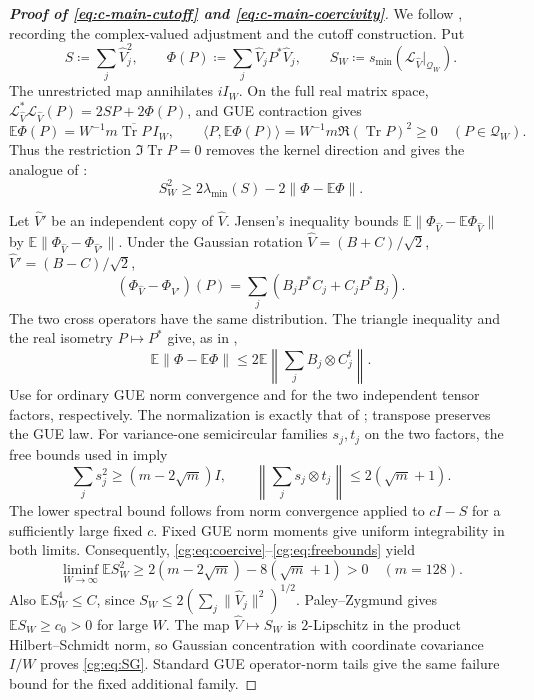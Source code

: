 \documentclass[11pt]{article}
\numberwithin{equation}{section}
\theoremstyle{remark}
\newcommand{\E}{\mathbb E}
\newcommand{\Tr}{\operatorname{Tr}}
\begin{document}
\begin{proof}[\textbf{Proof of \eqref{eq:c-main-cutoff} and \eqref{eq:c-main-coercivity}}]
We follow \cite[Appendix~A.1, proof of Lemma~A.2]{Drogin}, recording
the complex-valued adjustment and the cutoff construction.
Put
\[
 S\coloneqq\sum_j\widehat V_j^2,\qquad
 \Phi(P)\coloneqq\sum_j\widehat V_jP^*\widehat V_j,\qquad
 S_W\coloneqq s_{\min}(\mathcal L_{\widehat V}|_{\mathcal Q_W}).
\]
The unrestricted map annihilates \(iI_W\). On the full real matrix
space, \(\mathcal L_{\widehat V}^*\mathcal L_{\widehat V}(P)=2SP+2\Phi(P)\), and
GUE contraction gives
\[
 \E\Phi(P)=W^{-1} m\overline{\Tr P}\,I_W,\qquad
 \langle P,\E\Phi(P)\rangle
 =W^{-1} m\Re(\Tr P)^2\ge0\quad(P\in\mathcal Q_W).
\]
Thus the restriction \(\Im\Tr P=0\) removes the kernel direction
and gives the analogue of \cite[(42)]{Drogin}:
\begin{equation}
 S_W^2\ge2\lambda_{\min}(S)-2\|\Phi-\E\Phi\|.
 \label{cg:eq:coercive}
\end{equation}

Let \(\widehat V'\) be an independent copy of \(\widehat V\). Jensen's inequality
bounds \(\E\|\Phi_{\widehat V}-\E\Phi_{\widehat V}\|\) by \(\E\|\Phi_{\widehat V}-\Phi_{\widehat V'}\|\).
Under the Gaussian rotation
\(\widehat V=(B+C)/\sqrt2\), \(\widehat V'=(B-C)/\sqrt2\),
\[
 (\Phi_{\widehat V}-\Phi_{\widehat V'})(P)=\sum_j(B_jP^*C_j+C_jP^*B_j).
\]
The two cross operators have the same distribution. The triangle
inequality and the real isometry \(P\mapsto P^*\) give, as in
\cite[Appendix~A.1]{Drogin},
\begin{equation}
 \E\|\Phi-\E\Phi\|
 \le2\E\left\|\sum_jB_j\otimes C_j^t\right\|.
 \label{cg:eq:decouple}
\end{equation}
Use \cite[Corollary~1.2 and Lemma~9.6]{CGV} for ordinary GUE
norm convergence and for the two independent tensor factors,
respectively. The normalization is exactly that of
\cite[Definition~2.8(a)]{CGV}; transpose preserves the GUE law.
For variance-one semicircular families \(s_j,t_j\) on the two
factors, the free bounds used in \cite[Appendix~A.1]{Drogin} imply
\begin{equation}
 \sum_js_j^2\ge(m-2\sqrt m)I,\qquad
 \left\|\sum_js_j\otimes t_j\right\|\le2(\sqrt m+1).
 \label{cg:eq:freebounds}
\end{equation}
The lower spectral bound follows from norm convergence applied to
\(cI-S\) for a sufficiently large fixed \(c\). Fixed GUE norm
moments give uniform integrability in both limits. Consequently,
\eqref{cg:eq:coercive}--\eqref{cg:eq:freebounds} yield
\begin{equation}
 \liminf_{W\to\infty}\E S_W^2
 \ge2(m-2\sqrt m)-8(\sqrt m+1)>0\quad(m=128).
 \label{cg:eq:positive}
\end{equation}
Also \(\E S_W^4\le C\), since
\(S_W\le2(\sum_j\|\widehat V_j\|^2)^{1/2}\). Paley--Zygmund gives
\(\E S_W\ge c_0>0\) for large \(W\). The map \(\widehat V\mapsto S_W\)
is \(2\)-Lipschitz in the product Hilbert--Schmidt norm, so Gaussian
concentration with coordinate covariance \(I/W\) proves
\eqref{cg:eq:SG}. Standard GUE operator-norm tails give the same
failure bound for the fixed additional family.


\end{proof}
\end{document}
